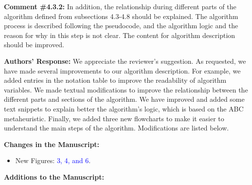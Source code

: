 \vspace{\baselineskip}

\begin{mdframed}[style=review] 
\textbf{Comment \#4.3.2:} In addition, the relationship during different parts of the algorithm defined from subsections 4.3-4.8 should be explained. The algorithm process is described following the pseudocode, and the algorithm logic and the reason for why in this step is not clear. The content for algorithm description should be improved.
\end{mdframed}

\textbf{Authors' Response:} We appreciate the reviewer's suggestion. As requested, we have made several improvements to our algorithm description. For example, we added entries in the notation table to improve the readability of algorithm variables. We made textual modifications to improve the relationship between the different parts and sections of the algorithm. We have improved and added some text snippets to explain better the algorithm's logic, which is based on the ABC metaheuristic. Finally, we added three new flowcharts to make it easier to understand the main steps of the algorithm. Modifications are listed below.

\textbf{Changes in the Manuscript:} 

\begin{itemize}
    \item New Figures: \textcolor{blue}{3, 4, and 6}.
\end{itemize}

\textbf{Additions to the Manuscript:}

